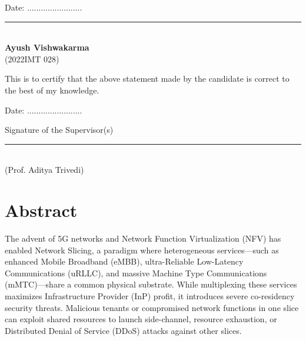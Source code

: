 \documentclass[12pt]{article}
\begin{document}
\vspace{1cm}

Date: ........................ 

\vspace{1.5cm}

\begin{center}
    \begin{minipage}[t]{0.4\textwidth}
        \centering
        \rule{5cm}{0.4pt} \\
        \textbf{Ayush Vishwakarma} \\
        (2022IMT 028)
    \end{minipage}
\end{center}

\vspace{1.5cm}

This is to certify that the above statement made by the candidate is correct to the best of my knowledge.

\vspace{1.5cm}

\begin{minipage}{0.45\textwidth}
    Date: ........................
\end{minipage}
\hfill
\begin{minipage}{0.45\textwidth}
    \raggedleft
    Signature of the Supervisor(s) \\
    \vspace{1cm}
    \rule{5cm}{0.4pt} \\
    \large(Prof. Aditya Trivedi)
\end{minipage}

\clearpage

\section*{Abstract}
The advent of 5G networks and Network Function Virtualization (NFV) has enabled Network Slicing, a paradigm where heterogeneous services---such as enhanced Mobile Broadband (eMBB), ultra-Reliable Low-Latency Communications (uRLLC), and massive Machine Type Communications (mMTC)---share a common physical substrate. While multiplexing these services maximizes Infrastructure Provider (InP) profit, it introduces severe co-residency security threats. Malicious tenants or compromised network functions in one slice can exploit shared resources to launch side-channel, resource exhaustion, or Distributed Denial of Service (DDoS) attacks against other slices. 
\end{document}
